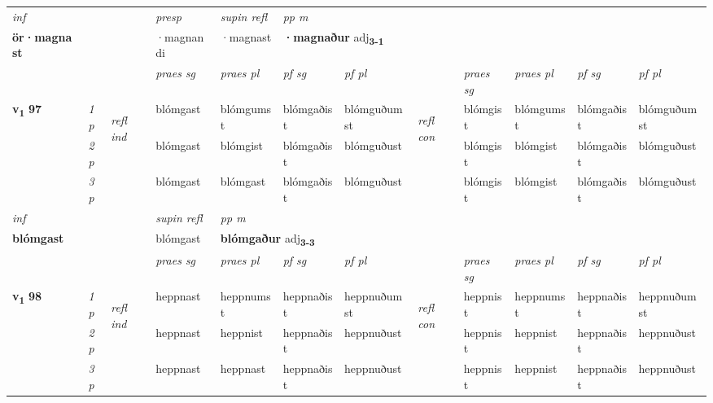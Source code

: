 \begin{longtable}[l]{X>{\footnotesize\itshape}llXXXXlXXXX}
   {\textit{inf}} & &     & \textit{presp}  & \textit{supin refl} & \textit{pp m} \\*
  {\textbf{ör\allowbreak ·magnast}} & &     & ·magnandi  & ·magnast & \multicolumn{2}{l}{\textbf{·magnaður} adj\textbf{\textsubscript{3-1}}} \\*

\midrule

 & &   & \textit{praes sg}  & \textit{praes pl}    & \textit{ pf sg} & \textit{pf pl} & & \textit{praes sg}  & \textit{praes pl}    & \textit{pf sg} & \textit{pf pl }  \\ \cmidrule{4-7} \cmidrule{9-12}
 \multirow{2}{*}{{{\textbf{v{\textsubscript{1}}} \Large{\textbf{97}}}}}  & 1p & \multirow{3}{*}{\begin{turn}{90}\textit{refl ind}\end{turn}}  & blómgast & blómgumst & blómgaðist & blómguðumst & \multirow{3}{*}{\begin{turn}{90}\textit{refl con}\end{turn}}  &blómgist & blómgumst & blómgaðist & blómguðumst \\*
 & 2p &  & blómgast & blómgist & blómgaðist & blómguðust & &blómgist & blómgist & blómgaðist & blómguðust \\*
 & 3p  & & blómgast & blómgast & blómgaðist & blómguðust & & blómgist & blómgist& blómgaðist & blómguðust \\*
\cmidrule{4-7} \cmidrule{9-12}

   {\textit{inf}} & &       & \textit{supin refl} & \textit{pp m} \\*
  {\textbf{blómgast}} & &       & blómgast & \multicolumn{2}{l}{\textbf{blómgaður} adj\textbf{\textsubscript{3-3}}} \\*

\midrule

 & &   & \textit{praes sg}  & \textit{praes pl}    & \textit{ pf sg} & \textit{pf pl} & & \textit{praes sg}  & \textit{praes pl}    & \textit{pf sg} & \textit{pf pl }  \\ \cmidrule{4-7} \cmidrule{9-12}
 \multirow{2}{*}{{{\textbf{v{\textsubscript{1}}} \Large{\textbf{98}}}}}  & 1p & \multirow{3}{*}{\begin{turn}{90}\textit{refl ind}\end{turn}}  & heppnast & heppnumst & heppnaðist & heppnuðumst & \multirow{3}{*}{\begin{turn}{90}\textit{refl con}\end{turn}}  &heppnist & heppnumst & heppnaðist & heppnuðumst \\*
 & 2p &  & heppnast & heppnist & heppnaðist & heppnuðust & &heppnist & heppnist & heppnaðist & heppnuðust \\*
 & 3p  & & heppnast & heppnast & heppnaðist & heppnuðust & & heppnist & heppnist& heppnaðist & heppnuðust \\*
\cmidrule{4-7} \cmidrule{9-12}


\end{longtable}
